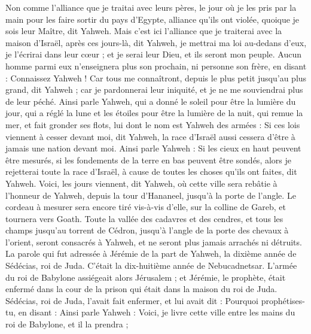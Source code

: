 \begin{multicols}{2}
Non comme l'alliance que je traitai avec leurs pères, le jour où je les pris par la main pour les faire sortir du pays d'Egypte, alliance qu'ils ont violée, quoique je sois leur Maître, dit Yahweh.
Mais c'est ici l'alliance que je traiterai avec la maison d'Israël, après ces jours-là, dit Yahweh, je mettrai ma loi au-dedans d'eux, je l'écrirai dans leur cœur ; et je serai leur Dieu, et ils seront mon peuple.
Aucun homme parmi eux n'enseignera plus son prochain, ni personne son frère, en disant : Connaissez Yahweh ! Car tous me connaîtront, depuis le plus petit jusqu'au plus grand, dit Yahweh ; car je pardonnerai leur iniquité, et je ne me souviendrai plus de leur péché.
Ainsi parle Yahweh, qui a donné le soleil pour être la lumière du jour, qui a réglé la lune et les étoiles pour être la lumière de la nuit, qui remue la mer, et fait gronder ses flots, lui dont le nom est Yahweh des armées :
Si ces lois viennent à cesser devant moi, dit Yahweh, la race d'Israël aussi cessera d'être à jamais une nation devant moi.
Ainsi parle Yahweh : Si les cieux en haut peuvent être mesurés, si les fondements de la terre en bas peuvent être sondés, alors je rejetterai toute la race d'Israël, à cause de toutes les choses qu'ils ont faites, dit Yahweh.
Voici, les jours viennent, dit Yahweh, où cette ville sera rebâtie à l'honneur de Yahweh, depuis la tour d'Hananeel, jusqu'à la porte de l'angle.
Le cordeau à mesurer sera encore tiré vis-à-vis d'elle, sur la colline de Gareb, et tournera vers Goath.
Toute la vallée des cadavres et des cendres, et tous les champs jusqu'au torrent de Cédron, jusqu'à l'angle de la porte des chevaux à l'orient, seront consacrés à Yahweh, et ne seront plus jamais arrachés ni détruits.
\VerseOne{}La parole qui fut adressée à Jérémie de la part de Yahweh, la dixième année de Sédécias, roi de Juda. C'était la dix-huitième année de Nebucadnetsar.
L'armée du roi de Babylone assiégeait alors Jérusalem ; et Jérémie, le prophète, était enfermé dans la cour de la prison qui était dans la maison du roi de Juda.
Sédécias, roi de Juda, l'avait fait enfermer, et lui avait dit : Pourquoi prophétises-tu, en disant : Ainsi parle Yahweh : Voici, je livre cette ville entre les mains du roi de Babylone, et il la prendra ;

\end{multicols}
